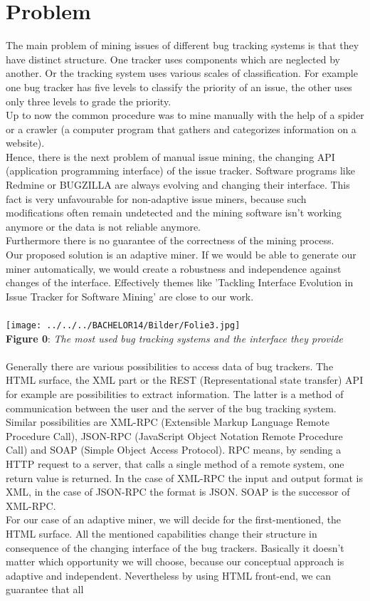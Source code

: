 \documentclass[12pt,a4paper,final]{article}
\begin{document}
\section{Problem}
The main problem of mining issues of different bug tracking systems is that they have distinct structure. One tracker uses components which are neglected by another. Or the tracking system uses various scales of classification. For example one bug tracker has five levels to classify the priority of an issue, the other uses only three levels to grade the priority. \\Up to now the common procedure was to mine manually with the help of a spider or a crawler (a computer program that gathers and categorizes information on a website). \\ Hence, there is the next problem of manual issue mining, the changing API (application programming interface) of the issue tracker. Software programs like Redmine or BUGZILLA are always evolving and changing their interface. This fact is very unfavourable for non-adaptive issue miners, because such modifications often remain undetected and the mining software isn't working anymore or the data is not reliable anymore. \\ Furthermore there is no guarantee of the correctness of the mining process. \\ Our proposed solution is an adaptive miner. If we would be able to generate our miner automatically, we would create a robustness and independence against changes of the interface. Effectively themes like 'Tackling Interface Evolution in Issue Tracker for Software Mining' are close to our work. \\ \\ \texttt{[image: ../../../BACHELOR14/Bilder/Folie3.jpg]} \\\textbf{Figure 0}: \textit{The most used bug tracking systems and the interface they provide} \\ \\Generally there are various possibilities to access data of bug trackers. The HTML surface, the XML part or the REST (Representational state transfer) API for example are possibilities to extract information. The latter is a method of communication between the user and the server of the bug tracking system. Similar possibilities are XML-RPC (Extensible Markup Language Remote Procedure Call), JSON-RPC (JavaScript Object Notation Remote Procedure Call) and SOAP (Simple Object Access Protocol). RPC means, by sending a HTTP request to a server, that calls a single method of a remote system, one return value is returned. In the case of XML-RPC the input and output format is XML, in the case of JSON-RPC the format is JSON. SOAP is the successor of XML-RPC.  \\ For our case of an adaptive miner, we will decide for the first-mentioned, the HTML surface. All the mentioned capabilities change their  structure in consequence of the changing interface of the bug trackers.  Basically it doesn't matter which opportunity we will choose, because our conceptual approach is adaptive and independent. Nevertheless by using HTML front-end, we can guarantee that all 
\end{document}
